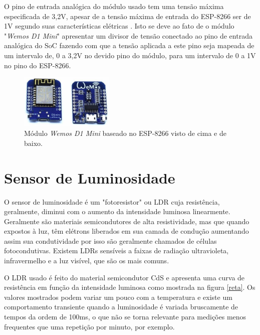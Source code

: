 O pino de entrada analógica do módulo usado tem uma tensão máxima especificada de 3,2V, apesar de a tensão máxima de entrada do ESP-8266 ser de 1V segundo suas características elétricas \cite{esp}. Isto se deve ao fato de o módulo "\textit{Wemos D1 Mini}" apresentar um divisor de tensão conectado ao pino de entrada analógica do SoC fazendo com que a tensão aplicada a este pino seja mapeada de um intervalo de, 0 a 3,2V no devido pino do módulo, para um intervalo de 0 a 1V no pino do ESP-8266.

\begin{figure}[ht]
    \begin{center}
    \includegraphics[width=0.4\textwidth]{figuras/wemos.PNG}
    \end{center}
    \caption[Ilustração do módulo \textit{Wemos D1 Mini}.]{Módulo \textit{Wemos D1 Mini} baseado no ESP-8266 visto de cima e de baixo.}
    \label{wemos}
\end{figure}

\section{Sensor de Luminosidade}

O sensor de luminosidade é um "fotoresistor" ou \acf{LDR} cuja resistência, geralmente, diminui com o aumento da intensidade luminosa linearmente. Geralmente são materiais semicondutores de alta resistividade, mas que quando expostos à luz, têm elétrons liberados em sua camada de condução aumentando assim sua condutividade por isso são geralmente chamados de células fotocondutivas. Existem LDRs sensíveis a faixas de radiação ultravioleta, infravermelho e a luz visível, que são os mais comuns.

O LDR usado \cite{ldr} é feito do material semicondutor CdS e apresenta uma curva de resistência em função da intensidade luminosa como mostrada na figura \ref{reta}. Os valores mostrados podem variar um pouco com a temperatura e existe um comportamento transiente quando a luminosidade é variada bruscamente de tempos da ordem de 100ms, o que não se torna relevante para medições menos frequentes que uma repetição por minuto, por exemplo.

